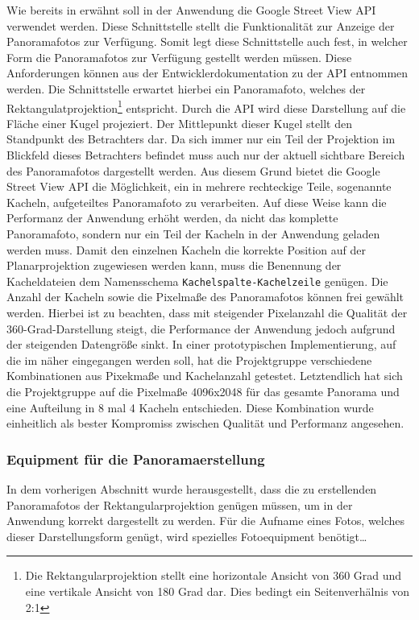 Wie bereits in  erwähnt soll in der Anwendung die Google
Street View API verwendet werden. Diese Schnittstelle stellt die Funktionalität
zur Anzeige der Panoramafotos zur Verfügung. Somit legt diese Schnittstelle auch
fest, in welcher Form die Panoramafotos zur Verfügung gestellt werden müssen.
Diese Anforderungen können aus der Entwicklerdokumentation zu der API entnommen
werden. Die Schnittstelle erwartet hierbei ein Panoramafoto, welches der
Rektangulatprojektion\footnote{Die Rektangularprojektion stellt eine
horizontale Ansicht von 360 Grad und eine vertikale Ansicht von 180 Grad dar.
Dies bedingt ein Seitenverhälnis von 2:1} entspricht. Durch die API wird diese
Darstellung auf die Fläche einer Kugel projeziert. Der Mittlepunkt dieser Kugel
stellt den Standpunkt des Betrachters dar. Da sich immer nur ein Teil der
Projektion im Blickfeld dieses Betrachters befindet muss auch nur der aktuell
sichtbare Bereich des Panoramafotos dargestellt werden. Aus diesem Grund bietet
die Google Street View API die Möglichkeit, ein in mehrere rechteckige Teile,
sogenannte Kacheln, aufgeteiltes Panoramafoto zu verarbeiten. Auf diese Weise
kann die Performanz der Anwendung erhöht werden, da nicht das komplette
Panoramafoto, sondern nur ein Teil der Kacheln in der Anwendung geladen werden
muss. Damit den einzelnen Kacheln die korrekte Position auf der Planarprojektion
zugewiesen werden kann, muss die Benennung der Kacheldateien dem Namensschema
\texttt{Kachelspalte-Kachelzeile} genügen. Die Anzahl der Kacheln sowie die
Pixelmaße des Panoramafotos können frei gewählt werden. Hierbei ist zu beachten,
dass mit steigender Pixelanzahl die Qualität der 360-Grad-Darstellung steigt,
die Performance der Anwendung jedoch aufgrund der steigenden Datengröße sinkt.
In einer prototypischen Implementierung, auf die im 
näher eingegangen werden soll, hat die Projektgruppe verschiedene Kombinationen
aus Pixekmaße und Kachelanzahl getestet. Letztendlich hat sich die Projektgruppe
auf die Pixelmaße 4096x2048 für das gesamte Panorama und eine Aufteilung in 8
mal 4 Kacheln entschieden. Diese Kombination wurde einheitlich als bester
Kompromiss zwischen Qualität und Performanz angesehen.

\subsubsection{Equipment für die Panoramaerstellung}
\label{sec:Equipment}

In dem vorherigen Abschnitt wurde herausgestellt, dass die zu erstellenden
Panoramafotos der Rektangularprojektion genügen müssen, um in der Anwendung
korrekt dargestellt zu werden. Für die Aufname eines Fotos, welches dieser
Darstellungsform genügt, wird spezielles Fotoequipment benötigt\ldots

